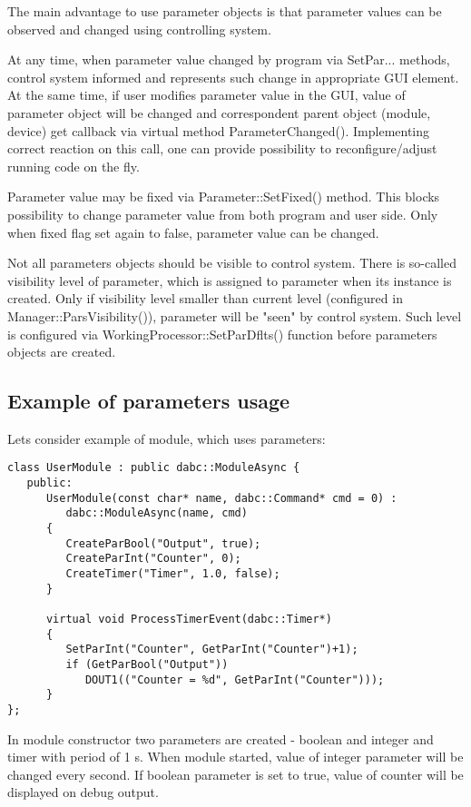 The main advantage to use parameter objects is that parameter values can be 
observed and changed using controlling system.

At any time, when parameter value changed by program via SetPar... methods, 
control system informed and represents such change in appropriate GUI element.
At the same time, if user modifies parameter value in the GUI, value of parameter object
will be changed and correspondent parent object (module, device) get callback via 
virtual method ParameterChanged(). Implementing correct reaction on this call, 
one can provide possibility to reconfigure/adjust running code on the fly.

Parameter value may be fixed via Parameter::SetFixed() method. This blocks possibility 
to change parameter value from both program and user side. Only when fixed flag set again to false,
parameter value can be changed. 

Not all parameters objects should be visible to control system. There is so-called 
visibility level of parameter, which is assigned to parameter when its instance is created.
Only if visibility level smaller than current level (configured in Manager::ParsVisibility()),
parameter will be "seen" by control system. Such level is configured  
via WorkingProcessor::SetParDflts() function before parameters objects are created.


\subsection{Example of parameters usage}

Lets consider example of module, which uses parameters:

\begin{verbatim}
class UserModule : public dabc::ModuleAsync {
   public:
      UserModule(const char* name, dabc::Command* cmd = 0) : 
         dabc::ModuleAsync(name, cmd)
      {
         CreateParBool("Output", true);
         CreateParInt("Counter", 0);
         CreateTimer("Timer", 1.0, false);
      }
      
      virtual void ProcessTimerEvent(dabc::Timer*)
      {
         SetParInt("Counter", GetParInt("Counter")+1);
         if (GetParBool("Output")) 
            DOUT1(("Counter = %d", GetParInt("Counter")));
      }
}; 
\end{verbatim}

In module constructor two parameters are created - boolean and integer and timer with period of 1 s.
When module started, value of integer parameter will be changed every second.
If boolean parameter is set to true, value of counter will be displayed on debug output.

